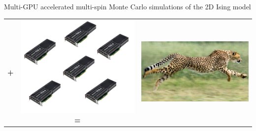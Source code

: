 \documentclass{beamer}
\begin{document}
\begin{frame}{Multi-GPU accelerated multi-spin Monte Carlo simulations of the 2D Ising model}
\begin{tabular}{c c c}
    
    \textbf{\huge{+}} &
    \includegraphics[keepaspectratio=true, width=0.2\paperwidth]{images/multi_gpu.png}
    \textbf{\huge{=}} &
    \includegraphics[keepaspectratio=true, width=0.2\paperwidth]{images/cheetah.jpg}
\end{tabular}
\end{frame}

\setcounter{framenumber}{0}
\end{document}
